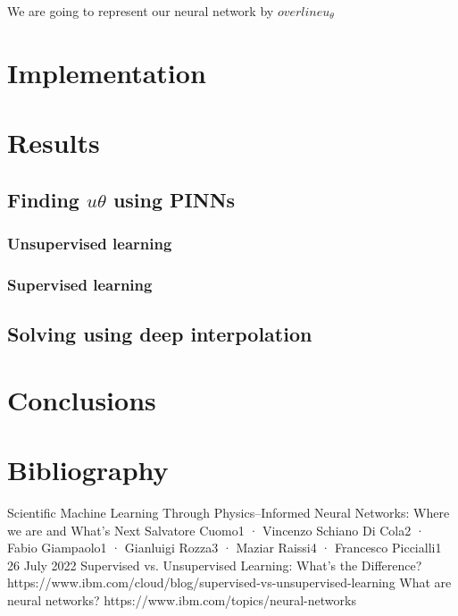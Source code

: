 \documentclass{article}
\begin{document}
We are going to represent our neural network by $overline{u_\theta}$  



\section{Implementation}


\section{Results}
\subsection{Finding $u\theta$ using PINNs}


\subsubsection{Unsupervised learning}


\subsubsection{Supervised learning}


\subsection{Solving using deep interpolation}



\section{Conclusions}


\section{Bibliography}
 {Scientific Machine Learning Through Physics–Informed Neural Networks: Where we are and What’s Next}
Salvatore Cuomo1 · Vincenzo Schiano Di Cola2 · Fabio Giampaolo1 · Gianluigi Rozza3 · Maziar Raissi4 · Francesco Piccialli1
26 July 2022
 {Supervised vs. Unsupervised Learning: What’s the Difference?} {https://www.ibm.com/cloud/blog/supervised-vs-unsupervised-learning}
 {What are neural networks?} {https://www.ibm.com/topics/neural-networks}
\end{document}
